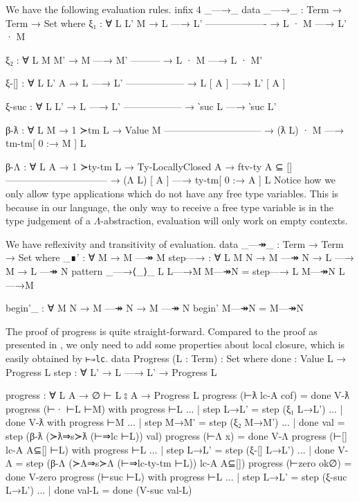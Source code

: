 \documentclass[logo,bsc,singlespacing,parskip,online]{infthesis}
\renewenvironment{code}{\mintedcopy[breaklines,breaksymbolleft=\;]{agda}}{\endmintedcopy}
\begin{document}
We have the following evaluation rules.
\begin{code}
  infix 4 _—→_
  data _—→_ : Term → Term → Set where
    ξ₁ : ∀ {L L' M}
      → L —→ L'
        -------------------
      → L · M —→ L' · M

    ξ₂ : ∀ {L M M'}
      → M —→ M'
        ---------
      → L · M —→ L · M'

    ξ-[] : ∀ {L L' A}
      → L —→ L'
        ------------------
      → L [ A ] —→ L' [ A ]

    ξ-suc : ∀ {L L'}
      → L —→ L'
        ------------------
      → ‵suc L —→ ‵suc L'

    β-ƛ : ∀ {L M}
      → 1 ≻tm L              → Value M
        ------------------------------
      → (ƛ L) · M —→ tm-tm[ 0 :→ M ] L

    β-Λ : ∀ {L A}
      → 1 ≻ty-tm L  → Ty-LocallyClosed A
      → ftv-ty A ⊆ []
        --------------------------------
      → (Λ L) [ A ] —→ ty-tm[ 0 :→ A ] L
\end{code}
Notice how we only allow type applications which do not have any free type variables. This is
because in our language, the only way to receive a free type variable is in the type judgement of a
$\Lambda$-abstraction, evaluation will only work on empty contexts.

We have reflexivity and transitivity of evaluation.
\begin{code}
  data _—↠_ : Term → Term → Set where
    _∎' : ∀ M → M —↠ M
    step—→ : ∀ L {M N} → M —↠ N → L —→ M → L —↠ N
  pattern _—→⟨_⟩_ L L—→M M—↠N = step—→ L M—↠N L—→M

  begin'_ : ∀ {M N} → M —↠ N → M —↠ N
  begin' M—↠N = M—↠N
\end{code}

The proof of progress is quite straight-forward. Compared to the proof as presented in
\citet{wadler_programming_2022}, we only need to add some properties about local closure, which is
easily obtained by \texttt{⊢⇒lc}.
\begin{code}
  data Progress (L : Term) : Set where
    done : Value L → Progress L
    step : ∀ {L'} → L —→ L' → Progress L

  progress : ∀ {L A} → ∅ ⊢ L ⦂ A → Progress L
  progress (⊢ƛ lc-A cof) = done V-ƛ
  progress (⊢· ⊢L ⊢M) with progress ⊢L
  ... | step L→L' = step (ξ₁ L→L')
  ... | done V-ƛ with progress ⊢M
  ...   | step M→M' = step (ξ₂ M→M')
  ...   | done val  = step (β-ƛ (≻ƛ⇒s≻ƛ (⊢⇒lc ⊢L)) val)
  progress (⊢Λ x) = done V-Λ
  progress (⊢[] lc-A A⊆[] ⊢L) with progress ⊢L
  ... | step L→L' = step (ξ-[] L→L')
  ... | done V-Λ = step (β-Λ (≻Λ⇒s≻Λ (⊢⇒lc-ty-tm ⊢L)) lc-A A⊆[])
  progress (⊢zero ok∅) = done V-zero
  progress (⊢suc ⊢L) with progress ⊢L
  ... | step L→L'  = step (ξ-suc L→L')
  ... | done val-L = done (V-suc val-L)
\end{code}
\end{document}
